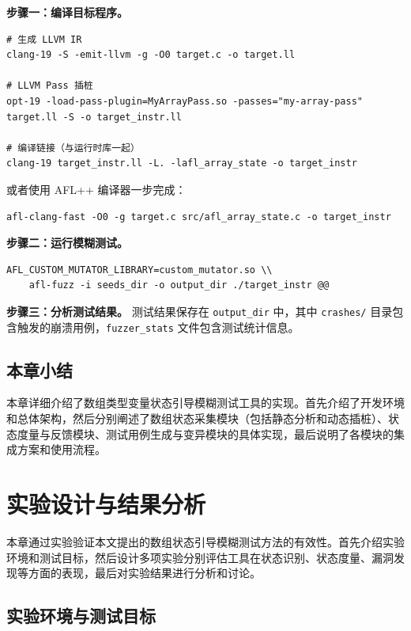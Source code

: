 \documentclass[bachelor]{njupthesis}
\begin{document}
\textbf{步骤一：编译目标程序。}

\begin{verbatim}
# 生成 LLVM IR
clang-19 -S -emit-llvm -g -O0 target.c -o target.ll

# LLVM Pass 插桩
opt-19 -load-pass-plugin=MyArrayPass.so -passes="my-array-pass" target.ll -S -o target_instr.ll

# 编译链接（与运行时库一起）
clang-19 target_instr.ll -L. -lafl_array_state -o target_instr
\end{verbatim}

或者使用 AFL++ 编译器一步完成：

\begin{verbatim}
afl-clang-fast -O0 -g target.c src/afl_array_state.c -o target_instr
\end{verbatim}

\textbf{步骤二：运行模糊测试。}

\begin{verbatim}
AFL_CUSTOM_MUTATOR_LIBRARY=custom_mutator.so \\
    afl-fuzz -i seeds_dir -o output_dir ./target_instr @@
\end{verbatim}

\textbf{步骤三：分析测试结果。} 测试结果保存在 \texttt{output\_dir} 中，其中 \texttt{crashes/} 目录包含触发的崩溃用例，\texttt{fuzzer\_stats} 文件包含测试统计信息。

\section{本章小结}

本章详细介绍了数组类型变量状态引导模糊测试工具的实现。首先介绍了开发环境和总体架构，然后分别阐述了数组状态采集模块（包括静态分析和动态插桩）、状态度量与反馈模块、测试用例生成与变异模块的具体实现，最后说明了各模块的集成方案和使用流程。

\chapter{实验设计与结果分析}

本章通过实验验证本文提出的数组状态引导模糊测试方法的有效性。首先介绍实验环境和测试目标，然后设计多项实验分别评估工具在状态识别、状态度量、漏洞发现等方面的表现，最后对实验结果进行分析和讨论。

\section{实验环境与测试目标}
\end{document}
